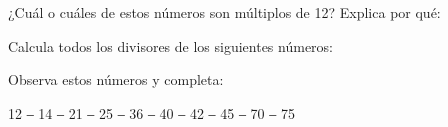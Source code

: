 \documentclass[addpoints,spanish, 12pt,a4paper]{exam}
\renewcommand*\half{.5}
\begin{document}
\begin{questions}

    \question[1] ¿Cuál o cuáles de estos números son múltiplos de 12? Explica por qué:

    \question[0\half] Calcula todos los divisores de los siguientes números:

    \question[1] Observa estos números y completa:

    12 ‒ 14 ‒ 21 ‒ 25 ‒ 36 ‒ 40 ‒ 42 ‒ 45 ‒ 70 ‒ 75

\end{questions}
\end{document}
